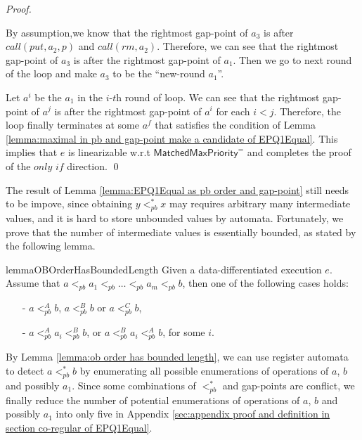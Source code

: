 \begin {proof}
\begin{itemize}
\begin{itemize}
        By assumption,we know that the rightmost gap-point of $a_3$ is after $\textit{call}(\textit{put},a_2,p)$ and $\textit{call}(\textit{rm},a_2)$. Therefore, we can see that the rightmost gap-point of $a_3$ is after the rightmost gap-point of $a_1$. Then we go to next round of the loop and make $a_3$ to be the ``new-round $a_1$''.
    \end{itemize}
\end{itemize}

Let $a^i$ be the $a_1$ in the $\textit{i-th}$ round of loop. We can see that the rightmost gap-point of $a^j$ is after the rightmost gap-point of $a^i$ for each $i<j$. Therefore, the loop finally terminates at some $a^f$ that satisfies the condition of Lemma \ref{lemma:maximal in pb and gap-point make a candidate of EPQ1Equal}. This implies that $e$ is linearizable w.r.t $\mathsf{MatchedMaxPriority}^{=}$ and completes the proof of the $\textit{only if}$ direction. \qed
\end {proof}

The result of Lemma \ref{lemma:EPQ1Equal as pb order and gap-point} still needs to be impove, since obtaining $y <_{\textit{pb}}^* x$ may requires arbitrary many intermediate values, and it is hard to store unbounded values by automata. Fortunately, we prove that the number of intermediate values is essentially bounded, as stated by the following lemma.

\begin{restatable}{lemma}{OBOrderHasBoundedLength}
\label{lemma:ob order has bounded length}
Given a data-differentiated execution $e$. Assume that $a <_{\textit{pb}} a_1 <_{\textit{pb}} \ldots <_{\textit{pb}} a_m <_{\textit{pb}} b$, then one of the following cases holds:

\begin{itemize}
\setlength{\itemsep}{0.5pt}
\item[-] $a <_{\textit{pb}}^A b$, $a <_{\textit{pb}}^B b$ or $a <_{\textit{pb}}^C b$,

\item[-] $a <_{\textit{pb}}^A a_i <_{\textit{pb}}^B b$, or $a <_{\textit{pb}}^B a_i <_{\textit{pb}}^A b$, for some $i$.
\end{itemize}
\end{restatable}

By Lemma \ref{lemma:ob order has bounded length}, we can use register automata to detect $a <_{\textit{pb}}^* b$ by enumerating all possible enumerations of operations of $a$, $b$ and possibly $a_1$. Since some combinations of $<_{\textit{pb}}^*$ and gap-points are conflict, we finally reduce the number of potential enumerations of operations of $a$, $b$ and possibly $a_1$ into only five in Appendix \ref{sec:appendix proof and definition in section co-regular of EPQ1Equal}.

